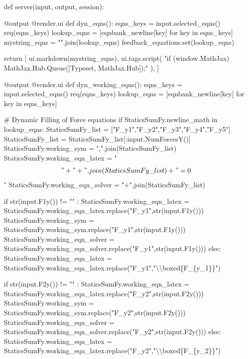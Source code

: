 \documentclass[
  letterpaper,
  DIV=11,
  numbers=noendperiod]{scrreprt}
\newenvironment{Shaded}{\begin{snugshade}}{\end{snugshade}}
\newcommand{\NormalTok}[1]{\textcolor[rgb]{0.00,0.23,0.31}{#1}}
\begin{document}
\begin{Shaded}
\begin{Highlighting}[]
\NormalTok{def server(input, output, session):}
   
\NormalTok{    @output}
\NormalTok{    @render.ui}
\NormalTok{    def dyn\_eqns():}
\NormalTok{        eqns\_keys = input.selected\_eqns()}
\NormalTok{        req(eqns\_keys)}
\NormalTok{        lookup\_eqns = [eqnbank\_newline[key] for key in eqns\_keys]}
\NormalTok{        mystring\_eqns = "".join(lookup\_eqns)}
\NormalTok{        feedback\_equations.set(lookup\_eqns)}

\NormalTok{        return [}
\NormalTok{            ui.markdown(mystring\_eqns),}
\NormalTok{            ui.tags.script(}
\NormalTok{                "if (window.MathJax) MathJax.Hub.Queue([\textquotesingle{}Typeset\textquotesingle{}, MathJax.Hub]);"}
\NormalTok{            ),}
\NormalTok{        ]}

\NormalTok{    @output}
\NormalTok{    @render.ui}
\NormalTok{    def dyn\_working\_eqns():}
\NormalTok{        eqns\_keys = input.selected\_eqns()}
\NormalTok{        req(eqns\_keys)}
\NormalTok{        lookup\_eqns = [eqnbank\_newline[key] for key in eqns\_keys]}
        

\NormalTok{        \# Dynamic Filling of Force equations }
\NormalTok{        if StaticsSumFy.newline\_math in lookup\_eqns:}
\NormalTok{            StaticsSumFy\_list = ["F\_y1","F\_y2","F\_y3","F\_y4","F\_y5"]}
\NormalTok{            StaticsSumFy\_list = StaticsSumFy\_list[:input.NumForcesY()]}
\NormalTok{            StaticsSumFy.working\_sym = ",".join(StaticsSumFy\_list)}
\NormalTok{            StaticsSumFy.working\_eqn\_latex = "$$" + "+".join(StaticsSumFy\_list) + "=0$$"}
\NormalTok{            StaticsSumFy.working\_eqn\_solver = "+".join(StaticsSumFy\_list)}
            
\NormalTok{            if str(input.F1y()) != "" : }
\NormalTok{                StaticsSumFy.working\_eqn\_latex = StaticsSumFy.working\_eqn\_latex.replace("F\_y1",str(input.F1y()))}
\NormalTok{                StaticsSumFy.working\_sym = StaticsSumFy.working\_sym.replace("F\_y1",str(input.F1y()))}
\NormalTok{                StaticsSumFy.working\_eqn\_solver = StaticsSumFy.working\_eqn\_solver.replace("F\_y1",str(input.F1y()))}
\NormalTok{            else:}
\NormalTok{                StaticsSumFy.working\_eqn\_latex = StaticsSumFy.working\_eqn\_latex.replace("F\_y1","\textbackslash{}\textbackslash{}boxed\{F\_\{y\_1\}\}")}
        
\NormalTok{            if str(input.F2y()) != "" : }
\NormalTok{                StaticsSumFy.working\_eqn\_latex = StaticsSumFy.working\_eqn\_latex.replace("F\_y2",str(input.F2y()))}
\NormalTok{                StaticsSumFy.working\_sym = StaticsSumFy.working\_sym.replace("F\_y2",str(input.F2y()))}
\NormalTok{                StaticsSumFy.working\_eqn\_solver = StaticsSumFy.working\_eqn\_solver.replace("F\_y2",str(input.F2y()))}
\NormalTok{            else:}
\NormalTok{                StaticsSumFy.working\_eqn\_latex = StaticsSumFy.working\_eqn\_latex.replace("F\_y2","\textbackslash{}\textbackslash{}boxed\{F\_\{y\_2\}\}")}
        

\end{Highlighting}
\end{Shaded}
\end{document}
